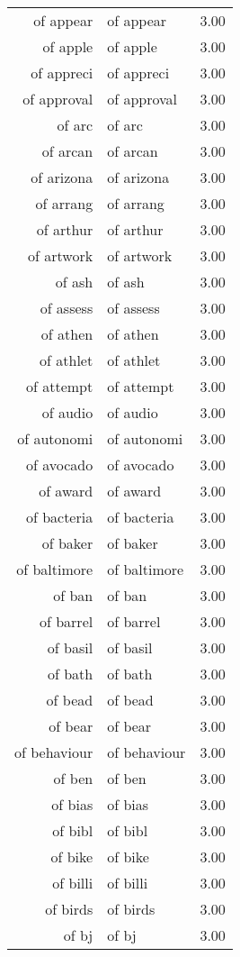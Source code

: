 \begin{table}[ht]
\begin{tabular}{rlr}
  of appear & of appear & 3.00 \\ 
  of apple & of apple & 3.00 \\ 
  of appreci & of appreci & 3.00 \\ 
  of approval & of approval & 3.00 \\ 
  of arc & of arc & 3.00 \\ 
  of arcan & of arcan & 3.00 \\ 
  of arizona & of arizona & 3.00 \\ 
  of arrang & of arrang & 3.00 \\ 
  of arthur & of arthur & 3.00 \\ 
  of artwork & of artwork & 3.00 \\ 
  of ash & of ash & 3.00 \\ 
  of assess & of assess & 3.00 \\ 
  of athen & of athen & 3.00 \\ 
  of athlet & of athlet & 3.00 \\ 
  of attempt & of attempt & 3.00 \\ 
  of audio & of audio & 3.00 \\ 
  of autonomi & of autonomi & 3.00 \\ 
  of avocado & of avocado & 3.00 \\ 
  of award & of award & 3.00 \\ 
  of bacteria & of bacteria & 3.00 \\ 
  of baker & of baker & 3.00 \\ 
  of baltimore & of baltimore & 3.00 \\ 
  of ban & of ban & 3.00 \\ 
  of barrel & of barrel & 3.00 \\ 
  of basil & of basil & 3.00 \\ 
  of bath & of bath & 3.00 \\ 
  of bead & of bead & 3.00 \\ 
  of bear & of bear & 3.00 \\ 
  of behaviour & of behaviour & 3.00 \\ 
  of ben & of ben & 3.00 \\ 
  of bias & of bias & 3.00 \\ 
  of bibl & of bibl & 3.00 \\ 
  of bike & of bike & 3.00 \\ 
  of billi & of billi & 3.00 \\ 
  of birds & of birds & 3.00 \\ 
  of bj & of bj & 3.00 \\ 

\end{tabular}
\end{table}
